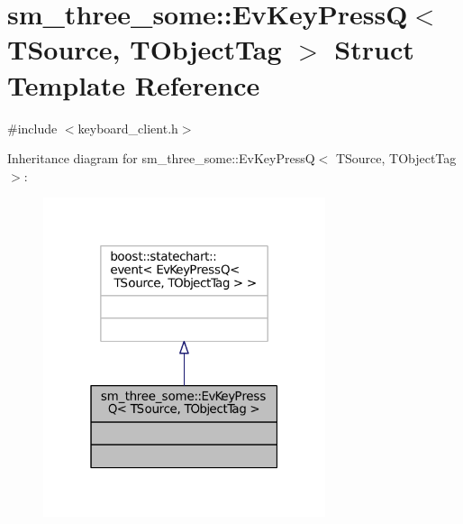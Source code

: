 \hypertarget{structsm__three__some_1_1EvKeyPressQ}{}\section{sm\+\_\+three\+\_\+some\+:\+:Ev\+Key\+PressQ$<$ T\+Source, T\+Object\+Tag $>$ Struct Template Reference}
\label{structsm__three__some_1_1EvKeyPressQ}


{\ttfamily \#include $<$keyboard\+\_\+client.\+h$>$}



Inheritance diagram for sm\+\_\+three\+\_\+some\+:\+:Ev\+Key\+PressQ$<$ T\+Source, T\+Object\+Tag $>$\+:
\nopagebreak
\begin{figure}[H]
\begin{center}
\leavevmode
\includegraphics[width=235pt]{structsm__three__some_1_1EvKeyPressQ__inherit__graph}
\end{center}
\end{figure}


